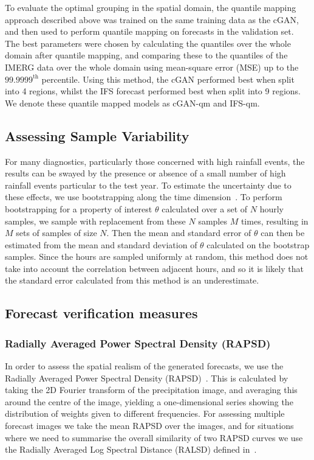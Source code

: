 \documentclass{article}
\begin{document}
To evaluate the optimal grouping in the spatial domain, the quantile mapping approach described above was trained on the same training data as the cGAN, and then used to perform quantile mapping on forecasts in the validation set. The best parameters were chosen by calculating the quantiles over the whole domain after quantile mapping, and comparing these to the quantiles of the IMERG data over the whole domain using mean-square error (MSE) up to the $99.9999^{\text{th}}$ percentile. Using this method, the cGAN performed best when split into 4 regions, whilst the IFS forecast performed best when split into 9 regions. We denote these quantile mapped models as cGAN-qm and IFS-qm.



\subsection{Assessing Sample Variability}
\label{sec:sample_var}


For many diagnostics, particularly those concerned with high rainfall events, the results can be swayed by the presence or absence of a small number of high rainfall events particular to the test year. To estimate the uncertainty due to these effects, we use bootstrapping along the time dimension~\citep{efron_bootstrap_1986}. To perform bootstrapping for a property of interest $\theta$ calculated over a set of $N$ hourly samples, we sample with replacement from these $N$ samples $M$ times, resulting in $M$ sets of samples of size $N$. Then the mean and standard error of $\theta$ can then be estimated from the mean and standard deviation of $\theta$ calculated on the bootstrap samples. Since the hours are sampled uniformly at random, this method does not take into account the correlation between adjacent hours, and so it is likely that the standard error calculated from this method is an underestimate.



\subsection{Forecast verification measures}
\label{sec:verification}
\subsubsection{Radially Averaged Power Spectral Density (RAPSD)}
\label{sec:rapsd}

In order to assess the spatial realism of the generated forecasts, we use the Radially Averaged Power Spectral Density (RAPSD)~\citep{sinclair_empirical_2005, harris_multiscale_2001}. This is calculated by taking the 2D Fourier transform of the precipitation image, and averaging this around the centre of the image, yielding a one-dimensional series showing the distribution of weights given to different frequencies. For assessing multiple forecast images we take the mean RAPSD over the images, and for situations where we need to summarise the overall similarity of two RAPSD curves we use the Radially Averaged Log Spectral Distance (RALSD) defined in~\cite{harris_generative_2022}.
\end{document}
